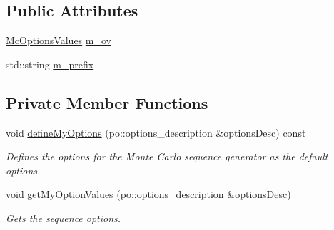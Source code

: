 \subsection*{Public Attributes}
\begin{DoxyCompactItemize}
\item 
\hyperlink{class_q_u_e_s_o_1_1_mc_options_values}{Mc\-Options\-Values} \hyperlink{class_q_u_e_s_o_1_1_monte_carlo_s_g_options_a4bc6849a41ede87425cad9ab6e97df11}{m\-\_\-ov}
\item 
std\-::string \hyperlink{class_q_u_e_s_o_1_1_monte_carlo_s_g_options_ac640fa60af7134d4113e9b7481a34f6c}{m\-\_\-prefix}
\end{DoxyCompactItemize}
\subsection*{Private Member Functions}
\begin{DoxyCompactItemize}
\item 
void \hyperlink{class_q_u_e_s_o_1_1_monte_carlo_s_g_options_a775af44dc1a1864874a851a3c2620d9b}{define\-My\-Options} (po\-::options\-\_\-description \&options\-Desc) const 
\begin{DoxyCompactList}\small\item\em Defines the options for the Monte Carlo sequence generator as the default options. \end{DoxyCompactList}\item 
void \hyperlink{class_q_u_e_s_o_1_1_monte_carlo_s_g_options_a6afa09e29e5adc13280c5e44e65f2544}{get\-My\-Option\-Values} (po\-::options\-\_\-description \&options\-Desc)
\begin{DoxyCompactList}\small\item\em Gets the sequence options. \end{DoxyCompactList}\end{DoxyCompactItemize}
